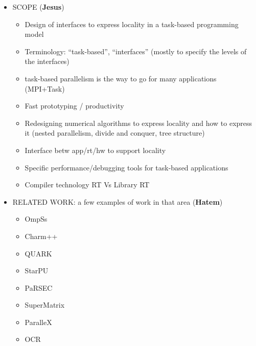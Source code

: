 \begin{itemize}


	\item SCOPE (\textbf{Jesus})
	\begin{itemize}
		\item Design of interfaces to express
		      locality in a task-based programming model
		\item Terminology: ``task-based'', ``interfaces'' (mostly to specify the levels of the interfaces)
		\item task-based parallelism is the way to go for many applications (MPI+Task)
		\item Fast prototyping / productivity
		\item Redesigning numerical algorithms to express locality
		and how to express it (nested parallelism, divide and conquer, tree structure)
		\item Interface betw app/rt/hw to support locality
		\item Specific performance/debugging tools for task-based applications
		\item Compiler technology RT Vs Library RT
	\end{itemize}



	\item RELATED WORK: a few examples of work in that area  (\textbf{Hatem})
	\begin{itemize}
		\item OmpSs
		\item Charm++
		\item QUARK
		\item StarPU
		\item PaRSEC
		\item SuperMatrix
		\item ParalleX
		\item OCR
	\end{itemize}




\end{itemize}
